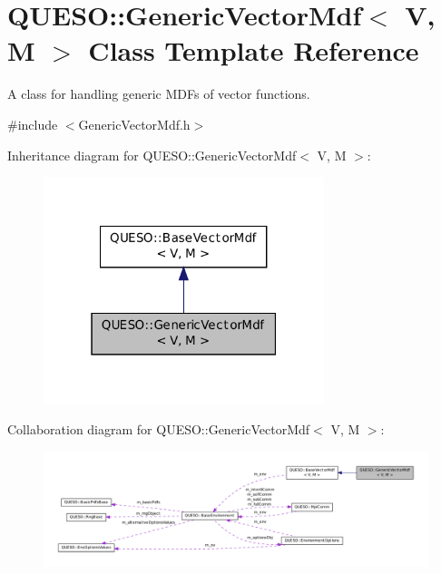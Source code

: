 \hypertarget{class_q_u_e_s_o_1_1_generic_vector_mdf}{\section{Q\-U\-E\-S\-O\-:\-:Generic\-Vector\-Mdf$<$ V, M $>$ Class Template Reference}
\label{class_q_u_e_s_o_1_1_generic_vector_mdf}
}


A class for handling generic M\-D\-Fs of vector functions.  




{\ttfamily \#include $<$Generic\-Vector\-Mdf.\-h$>$}



Inheritance diagram for Q\-U\-E\-S\-O\-:\-:Generic\-Vector\-Mdf$<$ V, M $>$\-:
\nopagebreak
\begin{figure}[H]
\begin{center}
\leavevmode
\includegraphics[width=232pt]{class_q_u_e_s_o_1_1_generic_vector_mdf__inherit__graph}
\end{center}
\end{figure}


Collaboration diagram for Q\-U\-E\-S\-O\-:\-:Generic\-Vector\-Mdf$<$ V, M $>$\-:
\nopagebreak
\begin{figure}[H]
\begin{center}
\leavevmode
\includegraphics[width=350pt]{class_q_u_e_s_o_1_1_generic_vector_mdf__coll__graph}
\end{center}
\end{figure}
